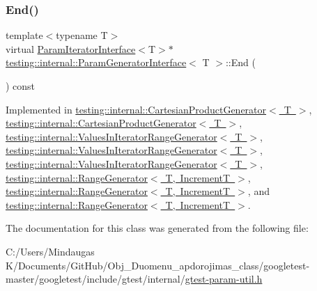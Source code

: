 \subsubsection{\texorpdfstring{End()}{End()}\hspace{0.1cm}{\footnotesize\ttfamily [3/3]}}
{\footnotesize\ttfamily template$<$typename T$>$ \\
virtual \mbox{\hyperlink{classtesting_1_1internal_1_1_param_iterator_interface}{Param\+Iterator\+Interface}}$<$T$>$$\ast$ \mbox{\hyperlink{classtesting_1_1internal_1_1_param_generator_interface}{testing\+::internal\+::\+Param\+Generator\+Interface}}$<$ T $>$\+::End (\begin{DoxyParamCaption}{ }\end{DoxyParamCaption}) const\hspace{0.3cm}{\ttfamily [pure virtual]}}



Implemented in \mbox{\hyperlink{classtesting_1_1internal_1_1_cartesian_product_generator_ae072dcf8400ac9dd5692e417262a664b}{testing\+::internal\+::\+Cartesian\+Product\+Generator$<$ T $>$}}, \mbox{\hyperlink{classtesting_1_1internal_1_1_cartesian_product_generator_ae072dcf8400ac9dd5692e417262a664b}{testing\+::internal\+::\+Cartesian\+Product\+Generator$<$ T $>$}}, \mbox{\hyperlink{classtesting_1_1internal_1_1_values_in_iterator_range_generator_a298cfb66a90b1a39c0cea3ca7ae1ece1}{testing\+::internal\+::\+Values\+In\+Iterator\+Range\+Generator$<$ T $>$}}, \mbox{\hyperlink{classtesting_1_1internal_1_1_values_in_iterator_range_generator_a298cfb66a90b1a39c0cea3ca7ae1ece1}{testing\+::internal\+::\+Values\+In\+Iterator\+Range\+Generator$<$ T $>$}}, \mbox{\hyperlink{classtesting_1_1internal_1_1_values_in_iterator_range_generator_a4af95b9eccfc86c40a715df2d9d0df40}{testing\+::internal\+::\+Values\+In\+Iterator\+Range\+Generator$<$ T $>$}}, \mbox{\hyperlink{classtesting_1_1internal_1_1_range_generator_ac112ca69567b9c47bf14554e0473e1e2}{testing\+::internal\+::\+Range\+Generator$<$ T, Increment\+T $>$}}, \mbox{\hyperlink{classtesting_1_1internal_1_1_range_generator_ac112ca69567b9c47bf14554e0473e1e2}{testing\+::internal\+::\+Range\+Generator$<$ T, Increment\+T $>$}}, and \mbox{\hyperlink{classtesting_1_1internal_1_1_range_generator_a8d2acbb733791a14df6e7bd3754e9003}{testing\+::internal\+::\+Range\+Generator$<$ T, Increment\+T $>$}}.



The documentation for this class was generated from the following file\+:\begin{DoxyCompactItemize}
\item 
C\+:/\+Users/\+Mindaugas K/\+Documents/\+Git\+Hub/\+Obj\+\_\+\+Duomenu\+\_\+apdorojimas\+\_\+class/googletest-\/master/googletest/include/gtest/internal/\mbox{\hyperlink{googletest-master_2googletest_2include_2gtest_2internal_2gtest-param-util_8h}{gtest-\/param-\/util.\+h}}\end{DoxyCompactItemize}
